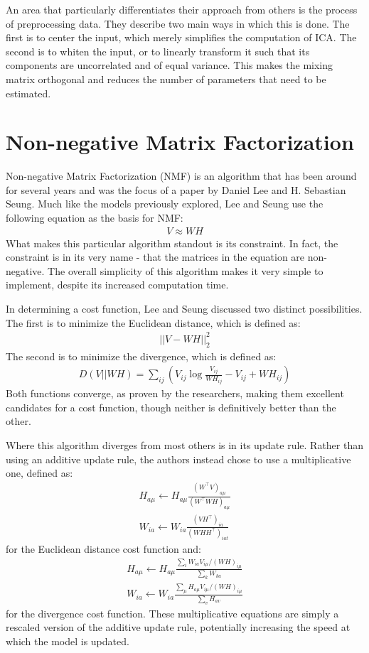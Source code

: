 \documentclass{article}
\begin{document}
An area that particularly differentiates their approach from others is the process of preprocessing data. They describe two main ways in which this is done. The first is to center the input, which merely simplifies the computation of ICA. The second is to whiten the input, or to linearly transform it such that its components are uncorrelated and of equal variance. This makes the mixing matrix orthogonal and reduces the number of parameters that need to be estimated. 

\section{Non-negative Matrix Factorization}

Non-negative Matrix Factorization (NMF) is an algorithm that has been around for several years and was the focus of a paper by Daniel Lee and H. Sebastian Seung. Much like the models previously explored, Lee and Seung use the following equation as the basis for NMF:
\begin{align*}
 V \approx WH
\end{align*}
What makes this particular algorithm standout is its constraint. In fact, the constraint is in its very name - that the matrices in the equation are non-negative. The overall simplicity of this algorithm makes it very simple to implement, despite its increased computation time.

In determining a cost function, Lee and Seung discussed two distinct possibilities. The first is to minimize the Euclidean distance, which is defined as:
\begin{align*}
 || V - WH ||_2^2
\end{align*}
The second is to minimize the divergence, which is defined as:
\begin{align*}
 D(V || WH) = \sum_{ij} (V_{ij} \log \frac{V_{ij}}{WH_{ij}} - V_{ij} + WH_{ij})
\end{align*}
Both functions converge, as proven by the researchers, making them excellent candidates for a cost function, though neither is definitively better than the other.

Where this algorithm diverges from most others is in its update rule. Rather than using an additive update rule, the authors instead chose to use a multiplicative one, defined as:
\begin{align*}
 H_{a \mu} \leftarrow H_{a \mu} \frac{(W^\top V)_{a \mu}}{(W^\top W H)_{a \mu}} \\
 W_{ia} \leftarrow W_{ia} \frac{(V H^\top)_{ia}}{(WHH^\top)_{iat}}
\end{align*}
for the Euclidean distance cost function and:
\begin{align*}
 H_{a \mu} \leftarrow H_{a \mu} \frac{\sum_i W_{ia}V_{i \mu} / (WH)_{i \mu}}{\sum_k W_{ka}} \\
 W_{ia} \leftarrow W_{ia} \frac{\sum_\mu H_{a \mu}V_{i \mu} / (WH)_{i \mu}}{\sum_v H_{av}}
\end{align*}
for the divergence cost function. These multiplicative equations are simply a rescaled version of the additive update rule, potentially increasing the speed at which the model is updated.
\end{document}
